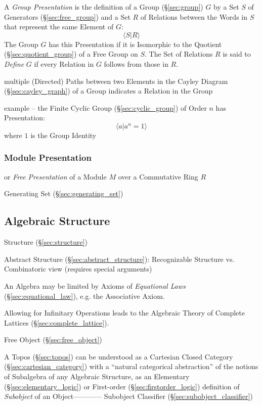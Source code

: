 A \emph{Group Presentation} is the definition of a Group (\S\ref{sec:group}) $G$
by a Set $S$ of Generators (\S\ref{sec:free_group}) and a Set $R$ of Relations
between the Words in $S$ that represent the same Element of $G$:
\[
  \langle S | R \rangle
\]
The Group $G$ has this Presentation if it is Isomorphic to the Quotient
(\S\ref{sec:quotient_group}) of a Free Group on $S$. The Set of Relations $R$ is
said to \emph{Define} $G$ if every Relation in $G$ follows from those in $R$.

multiple (Directed) Paths between two Elements in the Cayley Diagram
(\S\ref{sec:cayley_graph}) of a Group indicates a Relation in the Group

example -- the Finite Cyclic Group (\S\ref{sec:cyclic_group}) of Order $n$ has
Presentation:
\[
  \langle{a | a^n = 1}\rangle
\]
where $1$ is the Group Identity



\subsubsection{Module Presentation}\label{sec:module_presentation}

or \emph{Free Presentation} of a Module $M$ over a Commutative Ring $R$

Generating Set (\S\ref{sec:generating_set})



\subsection{Algebraic Structure}\label{sec:algebraic_structure}

Structure (\S\ref{sec:structure})

Abstract Structure (\S\ref{sec:abstract_structure}): Recognizable Structure vs.
Combinatoric view (requires special arguments)

An Algebra may be limited by Axioms of \emph{Equational Laws}
(\S\ref{sec:equational_law}), e.g. the Associative Axiom.

Allowing for Infinitary Operations leads to the Algebraic Theory of Complete
Lattices (\S\ref{sec:complete_lattice}).

Free Object (\S\ref{sec:free_object})

\fist A Topos (\S\ref{sec:topos}) can be understood as a Cartesian Closed
Category (\S\ref{sec:cartesian_category}) with a ``natural categorical
abstraction'' of the notions of Subalgebra of any Algebraic Structure, as an
Elementary (\S\ref{sec:elementary_logic}) or First-order
(\S\ref{sec:firstorder_logic}) definition of \emph{Subobject} of an
Object------------ Subobject Classifier (\S\ref{sec:subobject_classifier})

